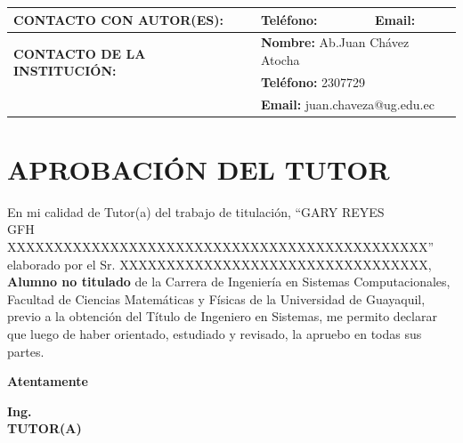 \documentclass[12pt, a4paper, nofontenc, numbers=endperiod]{apa7}
\begin{document}
{\begin{center}
{\begin{tabular}{|p{1.5cm} l|l|}
					\tabularnewline
					\hline
					\multicolumn{1}{|l|}{\textbf{\footnotesize CONTACTO CON AUTOR(ES):}} & \multicolumn{1}{p{2.5cm}|}{\textbf{\footnotesize Teléfono: \hspace{1.5cm} }} & \multicolumn{1}{p{2.5cm}|}{\textbf{\footnotesize Email:}}\\
					\hline 
					\multirow{2}{9cm}{\textbf{\small CONTACTO DE LA INSTITUCIÓN:}}	& \multicolumn{2}{|p{7cm}|}{\textbf{\footnotesize Nombre:} Ab.Juan Chávez Atocha}\tabularnewline \cline{2-3}
					& \multicolumn{2}{|p{5.5cm}|}{\textbf{\footnotesize Teléfono: }2307729}
					\tabularnewline \cline{2-3}
					& \multicolumn{2}{|p{7cm}|}{\textbf{\footnotesize Email:} juan.chaveza@ug.edu.ec}
					\tabularnewline
					\hline
				\end{tabular}
			}
		\end{center}
	}
	\newpage
	{ %
		\fancyhf{}
		\fancyhead[R]{\thepage}
		\section*{\large \centering APROBACIÓN DEL TUTOR}
		\vspace*{5cm}
		\justify
		En mi calidad de Tutor(a) del trabajo de titulación, ``GARY REYES\\  GFH \\
		XXXXXXXXXXXXXXXXXXXXXXXXXXXXXXXXXXXXXXXXXXXXX'' elaborado por el Sr.                                                                                                                     XXXXXXXXXXXXXXXXXXXXXXXXXXXXXXXXX, \textbf{Alumno no titulado}   de la  Carrera de Ingeniería en Sistemas Computacionales, Facultad de Ciencias Matemáticas y Físicas de la Universidad de Guayaquil,  previo a la obtención del Título de Ingeniero en Sistemas, me permito declarar que luego de haber orientado, estudiado y revisado, la apruebo en todas sus partes.
		\begin{center}
			\textbf{Atentamente}
		\end{center}
		\begin{center}
			\textbf{Ing.} \\
			\textbf{TUTOR(A)}
		\end{center}
		\newpage}
\end{document}
